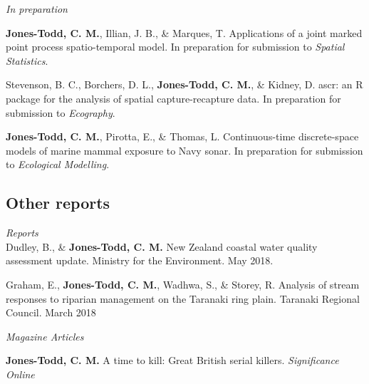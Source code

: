 \documentclass[10pt,a4paper]{moderncv}
\begin{document}
\textit{\small{In preparation}}\\

\vspace{-3pt}

\textbf{Jones-Todd, C. M.}, Illian, J. B., \& Marques, T. Applications of a joint marked point process spatio-temporal model. In preparation for submission to \textit{Spatial Statistics}.\\
\vspace{5pt}

\vspace{-3pt}
Stevenson, B. C., Borchers, D. L., \textbf{Jones-Todd, C. M.}, \& Kidney, D. ascr: an R package for the analysis of spatial capture-recapture data. In preparation for submission to \textit{Ecography}.\\
\vspace{5pt}

\vspace{-3pt}

\textbf{Jones-Todd, C. M.}, Pirotta, E., \&  Thomas, L. Continuous-time discrete-space models of marine mammal exposure to Navy sonar. In preparation for submission to \textit{Ecological Modelling}.\\

\subsection{Other reports}

\vspace{5pt}

\textit{\small{Reports}}\\

Dudley, B., \& \textbf{Jones-Todd, C. M.} New Zealand coastal water quality assessment update. Ministry for the Environment. May 2018.

\vspace{5pt}

Graham, E., \textbf{Jones-Todd, C. M.}, Wadhwa, S., \& Storey, R. Analysis of stream responses to riparian management on the Taranaki ring plain. Taranaki Regional Council. March 2018\\
\newpage

\textit{\small{Magazine Articles}}\\

\vspace{-3pt}

\textbf{Jones-Todd, C. M.} A time to kill: Great British serial killers. \textit{Significance Online}
\end{document}
